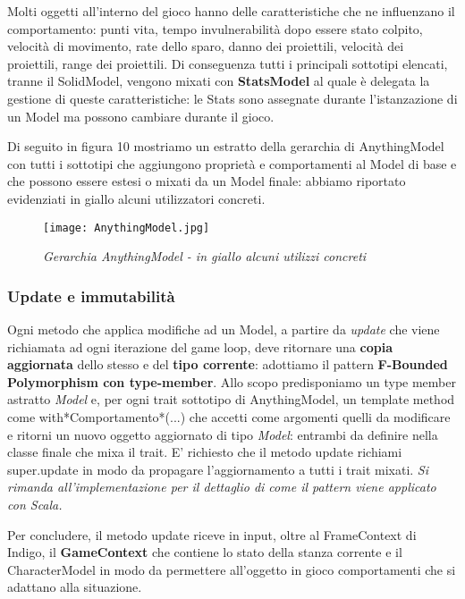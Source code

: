 Molti oggetti all'interno del gioco hanno delle caratteristiche che ne influenzano il comportamento: 
punti vita, tempo invulnerabilità dopo essere stato colpito, velocità di movimento, rate dello sparo, danno dei proiettili, velocità dei proiettili, range dei proiettili. 
Di conseguenza tutti i principali sottotipi elencati, tranne il SolidModel, vengono mixati con \textbf{StatsModel} al quale è delegata la gestione di queste caratteristiche: le Stats sono assegnate durante l'istanzazione di un Model ma possono cambiare durante il gioco.

Di seguito in figura 10 mostriamo un estratto della gerarchia di AnythingModel con tutti i sottotipi che aggiungono proprietà e comportamenti al Model di base e che possono essere estesi o mixati da un Model finale: abbiamo riportato evidenziati in giallo alcuni utilizzatori concreti.

\begin{figure}[!hbt]
    \centering
    \texttt{[image: AnythingModel.jpg]}
    \caption{\textit{Gerarchia AnythingModel - in giallo alcuni utilizzi concreti}} 
\end{figure}

\subsubsection{Update e immutabilità}

Ogni metodo che applica modifiche ad un Model, a partire da \textit{update} che viene richiamata ad ogni iterazione del game loop, deve ritornare una \textbf{copia aggiornata} dello stesso e del \textbf{tipo corrente}: adottiamo il pattern \textbf{F-Bounded Polymorphism con type-member}. 
Allo scopo predisponiamo un type member astratto \textit{Model} e, per ogni trait sottotipo di AnythingModel, un template method come with*Comportamento*(...) che accetti come argomenti quelli da modificare e ritorni un nuovo oggetto aggiornato di tipo \textit{Model}: entrambi da definire nella classe finale che mixa il trait.
E' richiesto che il metodo update richiami super.update in modo da propagare l'aggiornamento a tutti i trait mixati.
\textit{Si rimanda all'implementazione per il dettaglio di come il pattern viene applicato con Scala.}

Per concludere, il metodo update riceve in input, oltre al FrameContext di Indigo, il \textbf{GameContext} che contiene lo stato della stanza corrente e il CharacterModel in modo da permettere all'oggetto in gioco comportamenti che si adattano alla situazione.

